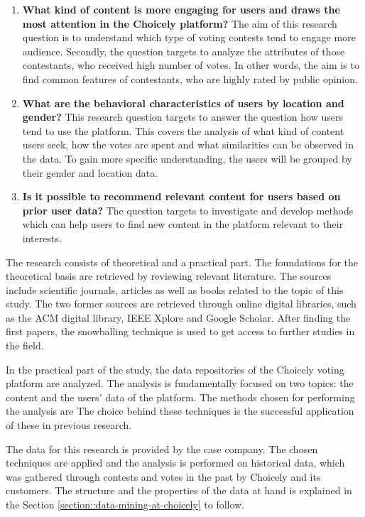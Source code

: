     \begin{enumerate}[label=RQ\arabic*:]
        \item \textbf{What kind of content is more engaging for users and draws the most attention in the Choicely platform?} The aim of this research question is to understand which type of voting contests tend to engage more audience. Secondly, the question targets to analyze the attributes of those contestants, who received high number of votes. In other words, the aim is to find common features of contestants, who are highly rated by public opinion.     
        \item \textbf{What are the behavioral characteristics of users by location and gender?} This research question targets to answer the question how users tend to use the platform. This covers the analysis of what kind of content users seek, how the votes are spent and what similarities can be observed in the data. To gain more specific understanding, the users will be grouped by their gender and location data.  
        \item \textbf{Is it possible to recommend relevant content for users based on prior user data?} The question targets to investigate and develop methods which can help users to find new content in the platform relevant to their interests.
    \end{enumerate}  

    The research consists of theoretical and a practical part. The foundations for the theoretical basis are retrieved by reviewing relevant literature. The sources include scientific journals, articles as well as books related to the topic of this study. The two former sources are retrieved through online digital libraries, such as the ACM digital library, IEEE Xplore and Google Scholar. After finding the first papers, the snowballing technique is used to get access to further studies in the field. 
    
    In the practical part of the study, the data repositories of the Choicely voting platform are analyzed. The analysis is fundamentally focused on two topics: the content and the users' data of the platform. The methods chosen for performing the analysis are %
    The choice behind these techniques is the successful application of these in previous research. 

    The data for this research is provided by the case company. The chosen techniques are applied and the analysis is performed on historical data, which was gathered through contests and votes in the past by Choicely and its customers. The structure and the properties of the data at hand is explained in the Section \ref{section::data-mining-at-choicely} to follow.
    
